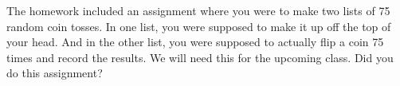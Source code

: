 \documentclass{ximera}
\begin{document}
\begin{question}
The homework included an assignment where you were to make two lists of 75 random coin tosses. In one list, you were supposed to make it up off the top of your head. And in the other list, you were supposed to actually flip a coin 75 times and record the results. We will need this for the upcoming class. Did you do this assignment? 
  \begin{solution}
    \begin{multiple-choice}
    \end{multiple-choice}
  \end{solution}
\end{question}
\end{document}
